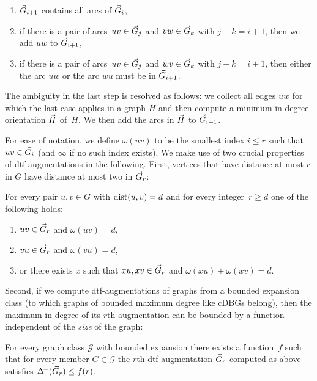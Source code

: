\begin{enumerate}
    \item $\vec{G}_{i+1}$ contains all arcs of $\vec{G}_i$,
    \item if there is a pair of arcs~$uv \in \vec{G}_j$
          and $vw \in \vec{G}_k$ with $j + k = i + 1$, then
          we add $uw$ to $\vec{G}_{i+1}$,
    \item if there is a pair of arcs~$uv \in \vec{G}_j$
          and $wv \in \vec{G}_k$ with $j + k = i + 1$, then
          either the arc $uw$ or the arc $wu$ must be
          in $\vec{G}_{i+1}$.
\end{enumerate}
The ambiguity in the last step is resolved as follows:
we collect all edges $uw$ for which the last case applies
in a graph $H$ and then compute a minimum in-degree
orientation $\vec{H}$ of~$H$. We then add the arcs
in $\vec{H}$ to $\vec{G}_{i+1}$.

For ease of notation, we define $\omega(uv)$ to be the
smallest index $i \leq r$ such that $uv \in \vec{G}_i$
(and $\infty$ if no such index exists).
We make use of two crucial properties of dtf augmentations
in the following. First, vertices that have distance at most
$r$ in $G$ have distance at most two in $\vec{G}_r$:

\begin{lemma}
  For every pair $u,v \in G$ with $\text{dist}(u,v) = d$ and
  for every integer~$r \geq d$ one of the following holds:
  \begin{enumerate}
    \item $uv \in \vec{G}_r$ and $\omega(uv) = d$,
    \item $vu \in \vec{G}_r$ and $\omega(vu) = d$,
    \item or there exists $x$ such that $xu, xv \in \vec{G}_r$ and
          $\omega(xu) + \omega(xv) = d$.
  \end{enumerate}
\end{lemma}

\noindent
Second, if we compute dtf-augmentations of graphs from a bounded
expansion class (to which graphs of bounded maximum degree like
cDBGs belong), then the maximum in-degree
of its $r$th augmentation can be bounded by a function independent
of the \emph{size} of the graph:

\begin{theorem}\label{thm:dtf}
  For every graph class $\mathcal G$ with bounded expansion there exists
  a function~$f$ such that for every member $G \in \mathcal G$
  the $r$th dtf-augmentation $\vec{G}_r$ computed as above
  satisfies
  $\Delta^{\!-}(\vec{G}_r) \leq f(r)$.
\end{theorem}

